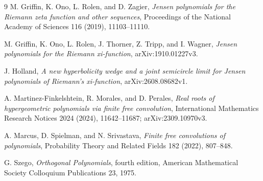 \documentclass[11pt]{article}
\theoremstyle{definition}
\theoremstyle{remark}
\begin{document}
\begin{thebibliography}{9}
M. Griffin, K. Ono, L. Rolen, and D. Zagier,
\emph{Jensen polynomials for the Riemann zeta function and other sequences},
Proceedings of the National Academy of Sciences 116 (2019), 11103--11110.

M. Griffin, K. Ono, L. Rolen, J. Thorner, Z. Tripp, and I. Wagner,
\emph{Jensen polynomials for the Riemann xi-function},
arXiv:1910.01227v3.

J. Holland,
\emph{A new hyperbolicity wedge and a joint semicircle limit for Jensen
polynomials of Riemann's xi-function}, arXiv:2608.08682v1.

A. Martinez-Finkelshtein, R. Morales, and D. Perales,
\emph{Real roots of hypergeometric polynomials via finite free convolution},
International Mathematics Research Notices 2024 (2024), 11642--11687;
arXiv:2309.10970v3.

A. Marcus, D. Spielman, and N. Srivastava,
\emph{Finite free convolutions of polynomials},
Probability Theory and Related Fields 182 (2022), 807--848.

G. Szego, \emph{Orthogonal Polynomials}, fourth edition,
American Mathematical Society Colloquium Publications 23, 1975.
\end{thebibliography}
\end{document}
